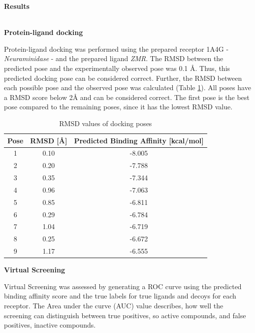 \documentclass[a4paper,10pt]{article}
\begin{document}
\begin{large}
	\vspace{0.5cm}
	\textbf{Results}
\end{large}	\\ [1mm]

\textbf{Protein-ligand docking}

Protein-ligand docking was performed using the prepared receptor 1A4G - \textit{Neuraminidase} - and the prepared ligand \textit{ZMR}. The RMSD between the predicted pose and the experimentally observed pose was 0.1 Å. Thus, this predicted docking pose can be considered correct. Further, the RMSD between each possible pose and the observed pose was calculated (Table \ref{tab:rmsd}). All poses have a RMSD score below 2Å and can be considered correct. The first pose is the best pose compared to the remaining poses, since it has the lowest RMSD value.


\begin{table}[h!]
\centering
\caption{RMSD values of docking poses}
\label{tab:rmsd}
\begin{tabular}{|c|c|c|}
\hline
\textbf{Pose} & \textbf{RMSD [\AA]} & \textbf{Predicted Binding Affinity [kcal/mol]} \\
\hline
1 & 0.10 & -8.005\\
2 & 0.20 & -7.788\\
3 & 0.35 & -7.344\\
4 & 0.96 & -7.063\\
5 & 0.85 & -6.811\\
6 & 0.29 & -6.784 \\
7 & 1.04 & -6.719 \\
8 & 0.25 & -6.672\\
9 & 1.17 & -6.555 \\
\hline
\end{tabular}
\end{table}


\textbf{Virtual Screening}

Virtual Screening was assessed by generating a ROC curve using the predicted binding affinity score and the true labels for true ligands and decoys for each receptor. The Area under the curve (AUC) value describes, how well the screening can distinguish between true positives, so active compounds, and false positives, inactive compounds. 
\end{document}

